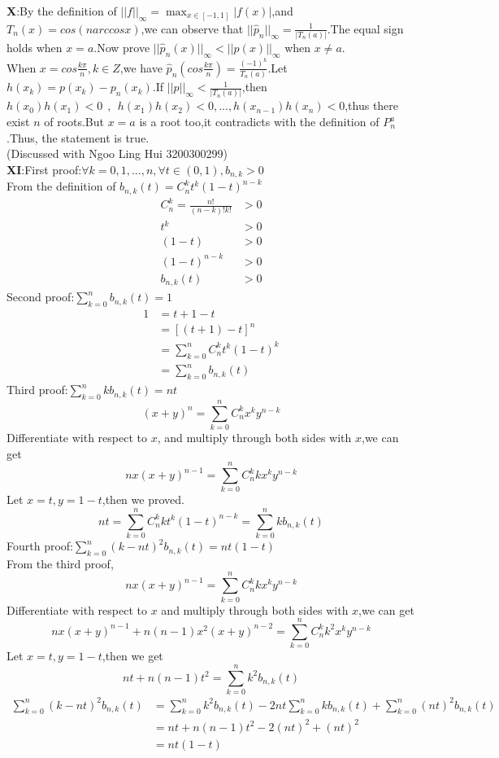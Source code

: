 \documentclass{ctexart}
\begin{document}
\textbf{X}:By the definition of $||f||_{\infty}=\max_{x \in [-1,1]}|f(x)|$,and $T_n(x)=cos(n arccos x)$,we can observe that 
$||\hat{p}_n||_\infty=\frac{1}{|T_n(a)|}$.The equal sign holds when $x=a$.Now prove $||\hat{p}_n(x)||_\infty < ||p(x)||_\infty$ when $x \neq a$.\\
When $x=cos\frac{k\pi}{n},k \in Z$,we have $\hat{p}_n(cos\frac{k\pi}{n})=\frac{(-1)^k}{T_n(a)}$.Let $h(x_k)=p(x_k)-p_n(x_k)$.If $||p||_\infty<\frac{1}{|T_n(a)|}$,then $h(x_0)h(x_1)<0\>\>,\>\>h(x_1)h(x_2)<0,...,h(x_{n-1})h(x_n)<0$,thus there exist $n$ of roots.But $x=a$ is a root too,it contradicts with the definition of $P_n^a$.Thus, the statement is true. \\
(Discussed with Ngoo Ling Hui 3200300299)
\\

\textbf{XI}:First proof:${\forall k=0,1,...,n},\forall t \in (0,1),b_{n,k}>0$\\
From the definition of $b_{n,k}(t)=C_n^kt^k(1-t)^{n-k}$
\begin{align*}
    C_n^k=\frac{n!}{(n-k)!k!}&>0\\
    t^k&>0\\
    (1-t)&>0\\
    (1-t)^{n-k}&>0\\
    b_{n,k}(t)&>0
\end{align*}
Second proof:$\sum_{k=0}^{n}b_{n,k}(t)=1$
\begin{align*}
    1&=t+1-t\\
    &=[(t+1)-t]^n\\
    &=\sum_{k=0}^{n}C_n^kt^k(1-t)^k\\
    &=\sum_{k=0}^{n}b_{n,k}(t)
\end{align*}
Third proof:$\sum_{k=0}^{n}kb_{n,k}(t)=nt$
$$(x+y)^n=\sum_{k=0}^{n}C_n^kx^ky^{n-k}$$
Differentiate with respect to $x$, and multiply through both sides with $x$,we can get
$$nx(x+y)^{n-1}=\sum_{k=0}^{n}C_n^kkx^ky^{n-k}$$
Let $x=t,y=1-t$,then we proved.
$$nt=\sum_{k=0}^{n}C_n^kkt^k(1-t)^{n-k}=\sum_{k=0}^{n}kb_{n,k}(t)$$
Fourth proof:$\sum_{k=0}^{n}(k-nt)^2b_{n,k}(t)=nt(1-t)$\\
From the third proof,
$$nx(x+y)^{n-1}=\sum_{k=0}^{n}C_n^kkx^ky^{n-k}$$
Differentiate with respect to $x$ and multiply through both sides with $x$,we can get
$$nx(x+y)^{n-1}+n(n-1)x^2(x+y)^{n-2}=\sum_{k=0}^{n}C_n^kk^2x^ky^{n-k}$$
Let $x=t,y=1-t$,then we get
$$nt+n(n-1)t^2=\sum_{k=0}^{n}k^2b_{n,k}(t)$$
\begin{align*}
    \sum_{k=0}^{n}(k-nt)^2b_{n,k}(t)&=\sum_{k=0}^{n}k^2b_{n,k}(t)-2nt\sum_{k=0}^{n}kb_{n,k}(t)+\sum_{k=0}^{n}(nt)^2b_{n,k}(t)\\
    &=nt+n(n-1)t^2-2(nt)^2+(nt)^2\\
    &=nt(1-t)
\end{align*}
\end{document}
